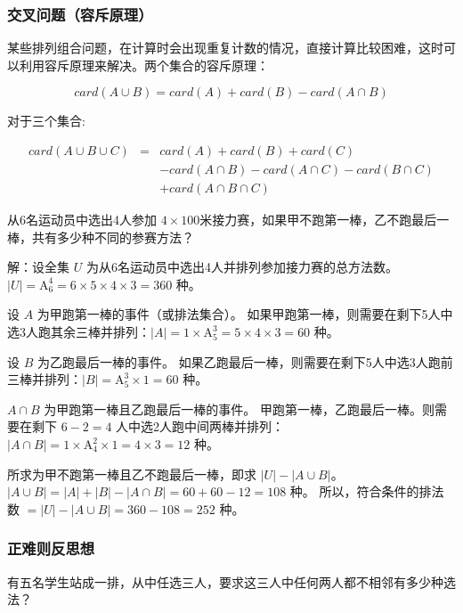 \subsubsection{交叉问题（容斥原理）}
某些排列组合问题，在计算时会出现重复计数的情况，直接计算比较困难，这时可以利用容斥原理来解决。两个集合的容斥原理：

$$card(A \cup B) = card(A) + card(B) - card(A \cap B)$$

对于三个集合:

\begin{eqnarray*}
    card(A \cup B \cup C) &=& card(A) + card(B) + card(C) \\
    &&- card(A \cap B) - card(A \cap C) - card(B \cap C) \\
    &&+ card(A \cap B \cap C)
\end{eqnarray*}

\begin{example}
    从6名运动员中选出4人参加 $4 \times 100$米接力赛，如果甲不跑第一棒，乙不跑最后一棒，共有多少种不同的参赛方法？
\end{example}
\begin{solution}
    解：设全集 $U$ 为从6名运动员中选出4人并排列参加接力赛的总方法数。
    $|U| = \mathrm{A}_{6}^{4} = 6 \times 5 \times 4 \times 3 = 360$ 种。

    设 $A$ 为甲跑第一棒的事件（或排法集合）。
    如果甲跑第一棒，则需要在剩下5人中选3人跑其余三棒并排列：$|A| = 1 \times \mathrm{A}_{5}^{3} = 5 \times 4 \times 3 = 60$ 种。

    设 $B$ 为乙跑最后一棒的事件。
    如果乙跑最后一棒，则需要在剩下5人中选3人跑前三棒并排列：$|B| = \mathrm{A}_{5}^{3} \times 1 = 60$ 种。

    $A \cap B$ 为甲跑第一棒且乙跑最后一棒的事件。
    甲跑第一棒，乙跑最后一棒。则需要在剩下 $6-2=4$ 人中选2人跑中间两棒并排列：$|A \cap B| = 1 \times \mathrm{A}_{4}^{2} \times 1 = 4 \times 3 = 12$ 种。

    所求为甲不跑第一棒且乙不跑最后一棒，即求 $|U| - |A \cup B|$。
    $|A \cup B| = |A| + |B| - |A \cap B| = 60 + 60 - 12 = 108$ 种。
    所以，符合条件的排法数 $= |U| - |A \cup B| = 360 - 108 = 252$ 种。
\end{solution}

\subsubsection{正难则反思想}

\begin{example}
    有五名学生站成一排，从中任选三人，要求这三人中任何两人都不相邻有多少种选法？
\end{example}

